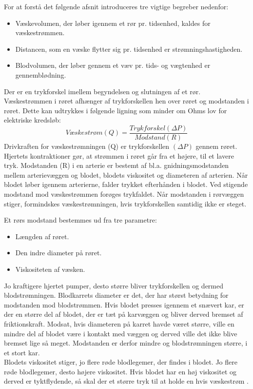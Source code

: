 For at forstå det følgende afsnit introduceres tre vigtige begreber nedenfor: 
\begin{itemize}
\item Væskevolumen, der løber igennem et rør pr. tidsenhed, kaldes for væskestrømmen.
\item Distancen, som en væske flytter sig pr. tidsenhed er strømningshastigheden.
\item Blodvolumen, der løber gennem et væv pr. tids- og vægtenhed er gennemblødning.
\end{itemize}

Der er en trykforskel imellem begyndelsen og slutningen af et rør. Væskestrømmen i røret afhænger af trykforskellen hen over røret og modstanden i røret. Dette kan udtrykkes i følgende ligning som minder om Ohms lov for elektriske kredsløb:  
\begin{equation}
Væskestrøm(Q)= \frac{Trykforskel(\Delta P)}{Modstand(R)}
\end{equation}
Drivkraften for væskestrømningen (Q) er trykforskellen $(\Delta P)$ gennem røret. Hjertets kontraktioner gør, at strømmen i røret går fra et højere, til et lavere tryk. 
Modstanden (R) i en arterie er bestemt af bl.a. gnidningsmodstanden mellem arterievæggen og blodet, blodets viskositet og diameteren af arterien. Når blodet løber igennem arterierne, falder trykket efterhånden i blodet. Ved stigende modstand mod væskestrømmen forøges trykfaldet. 
Når modstanden i rørvæggen stiger, formindskes væskestrømningen, hvis trykforskellen samtidig ikke er steget.

Et rørs modstand bestemmes ud fra tre parametre: 

\begin{itemize}
\item Længden af røret.
\item Den indre diameter på røret. 
\item Viskositeten af væsken.
\end{itemize}

Jo kraftigere hjertet pumper, desto større bliver trykforskellen og dermed blodstrømningen. 
Blodkarrets diameter er det, der har størst betydning for modstanden mod blodstrømmen. Hvis blodet presses igennem et snævert kar, er der en større del af blodet, der er tæt på karvæggen og bliver derved bremset af friktionskraft. Modsat, hvis diameteren på karret havde været større, ville en mindre del af blodet være i kontakt med væggen og derved ville det ikke blive bremset lige så meget. Modstanden er derfor mindre og blodstrømningen større, i et stort kar. \\
Blodets viskositet stiger, jo flere røde blodlegemer, der findes i blodet. Jo flere røde blodlegemer, desto højere viskositet. Hvis blodet har en høj viskositet og derved er tyktflydende, så skal der et større tryk til at holde en hvis væskestrøm \citep{Blodtryk}. 
   

